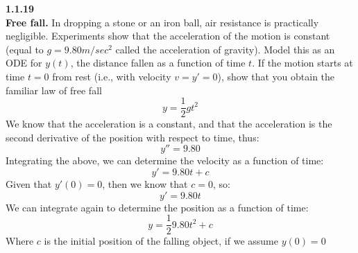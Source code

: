 \documentclass[12pt, letterpaper]{article}
\begin{document}
\setlength\parindent{0pt}
\textbf{
1.1.19\\
Free fall. 
}
In dropping a stone or an iron ball, air
resistance is practically negligible. Experiments
show that the acceleration of the motion is constant
(equal to $g = 9.80 m/sec^2$ called the
acceleration of gravity). Model this as an ODE for
$y(t)$, the distance fallen as a function of time $t$. If the
motion starts at time $t = 0$ from rest (i.e., with velocity
$v = y' = 0$), show that you obtain the familiar law of
free fall
\[ y = \frac{1}{2}gt^2 \]
We know that the acceleration is a constant, and that the acceleration
is the second derivative of the position with respect to time, thus:
\[ y'' = 9.80 \]
Integrating the above, we can determine the velocity as a function of time:
\[ y' = 9.80t + c \]
Given that $y'(0) = 0$, then we know that $c = 0$, so:
\[ y' = 9.80t \]
We can integrate again to determine the position as a function of time:
\[ y = \frac{1}{2}9.80t^2 + c \]
Where $c$ is the initial position of the falling object, if we assume $y(0) = 0$
\[ \]
\end{document}
